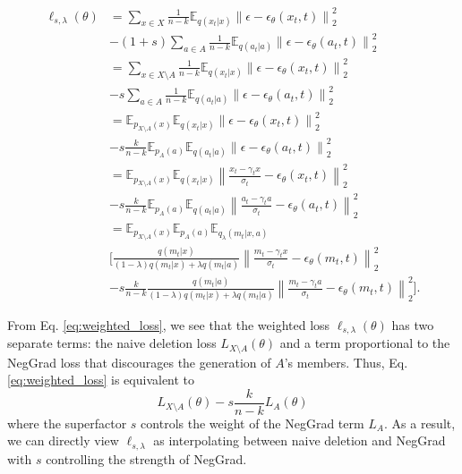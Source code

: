 \documentclass{article} \usepackage{iclr2025_conference,times}
\begin{document}
\begin{align}
\ell_{s,\lambda}(\theta)&=\sum_{x \in X} \frac{1}{n-k} \mathbb{E}_{q(x_t|x)}\left\|\epsilon-\epsilon_\theta(x_t, t)\right\|_2^2\\
&-(1+s)\sum_{a \in A} \frac{1}{n-k} \mathbb{E}_{q(a_t|a)}\left\|\epsilon-\epsilon_\theta(a_t, t)\right\|_2^2\nonumber\\
&=\sum_{x \in X\setminus A} \frac{1}{n-k} \mathbb{E}_{q(x_t|x)}\left\|\epsilon-\epsilon_\theta(x_t, t)\right\|_2^2\label{eq:weighted_loss}\\
&-s\sum_{a \in A} \frac{1}{n-k} \mathbb{E}_{q(a_t|a)}\left\|\epsilon-\epsilon_\theta(a_t, t)\right\|_2^2\nonumber\\
&=\mathbb{E}_{p_{X\setminus A}(x)}\mathbb{E}_{q(x_t|x)}\left\|\epsilon-\epsilon_\theta(x_t, t)\right\|_2^2\\
&-s\frac{k}{n-k}\mathbb{E}_{p_{A}(a)}\mathbb{E}_{q(a_t|a)}\left\|\epsilon-\epsilon_\theta(a_t, t)\right\|_2^2\nonumber\\
&=\mathbb{E}_{p_{X\setminus A}(x)}\mathbb{E}_{q(x_t|x)}\left\|\frac{x_t-\gamma_t x}{\sigma_t}-\epsilon_\theta(x_t, t)\right\|_2^2\\
&-s\frac{k}{n-k}\mathbb{E}_{p_{A}(a)}\mathbb{E}_{q(a_t|a)}\left\|\frac{a_t-\gamma_t a}{\sigma_t}-\epsilon_\theta(a_t, t)\right\|_2^2\nonumber\\
&=\mathbb{E}_{p_{X\setminus A}(x)} \mathbb{E}_{p_A(a)} \mathbb{E}_{q_\lambda\left(m_t| x, a\right)}\\
&\Bigg[\frac{q\left(m_t| x\right)}{(1-\lambda) q\left(m_t| x\right)+\lambda q\left(m_t| a\right)}\left\|\frac{m_t-\gamma_t x}{\sigma_t}-\epsilon_\theta(m_t, t)\right\|_2^2 \nonumber\\
& -s\frac{k}{n-k} \frac{q\left(m_t| a\right)}{(1-\lambda) q\left(m_t| x\right)+\lambda q\left(m_t| a\right)}\left\|\frac{m_t-\gamma_t a}{\sigma_t}-\epsilon_\theta(m_t, t)\right\|_2^2\Bigg]\nonumber.
\end{align}

From Eq. \ref{eq:weighted_loss}, we see that the weighted loss $\ell_{s,\lambda}(\theta)$ has two separate terms: the naive deletion loss $L_{X\setminus A}(\theta)$ and a term proportional to the NegGrad loss that discourages the generation of $A$'s members. Thus, Eq. \ref{eq:weighted_loss} is equivalent to 
$$L_{X\setminus A}(\theta)-s\frac{k}{n-k}L_A(\theta)$$
where the superfactor $s$ controls the weight of the NegGrad term $L_A$. As a result, we can directly view $\ell_{s,\lambda}$ as interpolating between naive deletion and NegGrad with $s$ controlling the strength of NegGrad. 
\end{document}
